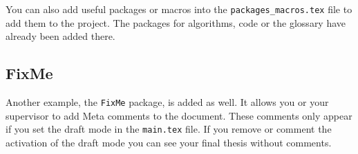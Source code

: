 You can also add useful packages or macros into the \verb|packages_macros.tex| file to add them to the project.
The packages for algorithms, code or the glossary have already been added there.

\subsection{FixMe}
Another example, the \verb|FixMe| package, is added as well. It allows you or your supervisor to add Meta comments to the document. These comments only appear if you set the draft mode in the \verb|main.tex| file. If you remove or comment the activation of the draft mode you can see your final thesis without comments.